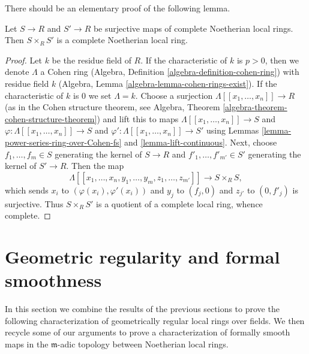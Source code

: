\noindent
There should be an elementary proof of the following lemma.

\begin{lemma}
\label{lemma-dominate-two-surjections}
Let $S \to R$ and $S' \to R$ be surjective maps of complete Noetherian local
rings. Then $S \times_R S'$ is a complete Noetherian local ring.
\end{lemma}

\begin{proof}
Let $k$ be the residue field of $R$. If the characteristic of
$k$ is $p > 0$, then we denote $\Lambda$ a Cohen ring
(Algebra, Definition \ref{algebra-definition-cohen-ring})
with residue field $k$ (Algebra, Lemma \ref{algebra-lemma-cohen-rings-exist}).
If the characteristic of $k$ is $0$ we set $\Lambda = k$.
Choose a surjection $\Lambda[[x_1, \ldots, x_n]] \to R$
(as in the Cohen structure theorem, see
Algebra, Theorem \ref{algebra-theorem-cohen-structure-theorem})
and lift this to maps $\Lambda[[x_1, \ldots, x_n]] \to S$ and
$\varphi : \Lambda[[x_1, \ldots, x_n]] \to S$ and
$\varphi' : \Lambda[[x_1, \ldots, x_n]] \to S'$ using
Lemmas \ref{lemma-power-series-ring-over-Cohen-fs} and
\ref{lemma-lift-continuous}.
Next, choose $f_1, \ldots, f_m \in S$ generating the kernel
of $S \to R$ and $f'_1, \ldots, f'_{m'} \in S'$ generating the
kernel of $S' \to R$. Then the map
$$
\Lambda[[x_1, \ldots, x_n, y_1, \ldots, y_m, z_1, \ldots, z_{m'}]]
\longrightarrow S \times_R S,
$$
which sends $x_i$ to $(\varphi(x_i), \varphi'(x_i))$ and
$y_j$ to $(f_j, 0)$ and
$z_{j'}$ to $(0, f'_j)$
is surjective. Thus $S \times_R S'$ is a quotient of a complete
local ring, whence complete.
\end{proof}






\section{Geometric regularity and formal smoothness}
\label{section-regular-fs}

\noindent
In this section we combine the results of the previous
sections to prove the following characterization of geometrically
regular local rings over fields. We then recycle some of our
arguments to prove a characterization of formally smooth
maps in the $\mathfrak m$-adic topology between Noetherian local
rings.

